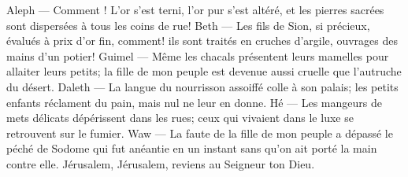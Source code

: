 Aleph --- Comment ! L’or s’est terni, l’or pur s’est altéré,
	et les pierres sacrées sont dispersées à tous les coins de rue!
Beth --- Les fils de Sion, si précieux, évalués à prix d’or fin, comment!
	ils sont traités en cruches d’argile, ouvrages des mains d’un potier!
Guimel --- Même les chacals présentent leurs mamelles pour allaiter leurs petits;
	la fille de mon peuple est devenue aussi cruelle que l’autruche du désert.
Daleth --- La langue du nourrisson assoiffé colle à son palais;
	les petits enfants réclament du pain, mais nul ne leur en donne.
Hé --- Les mangeurs de mets délicats dépérissent dans les rues;
	ceux qui vivaient dans le luxe se retrouvent sur le fumier.
Waw --- La faute de la fille de mon peuple a dépassé le péché de Sodome
	qui fut anéantie en un instant sans qu’on ait porté la main contre elle.
Jérusalem, Jérusalem, reviens au Seigneur ton Dieu.
